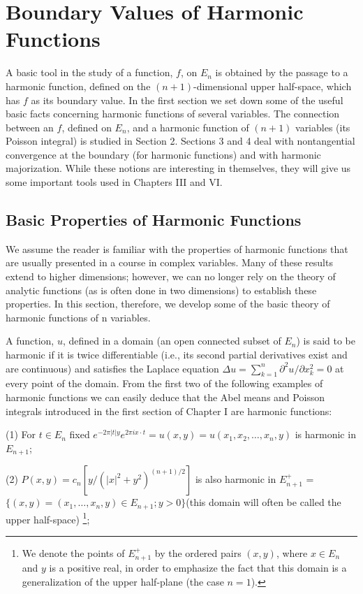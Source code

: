 \chapter{Boundary Values of Harmonic Functions}
\label{ch:c2}

A basic tool in the study of a function, $f$, on $E_n$ is obtained by the passage to a harmonic function, defined on the $(n+1)$-dimensional upper half-space, which has $f$ as its boundary value. In the first section we set down some of the useful basic facts concerning harmonic functions of several variables. The connection between an $f$, defined on $E_n$, and a harmonic function of $(n+1)$ variables (its Poisson integral) is studied in Section 2. Sections 3 and 4 deal with nontangential convergence at the boundary (for harmonic functions) and with harmonic majorization. While these notions are interesting in themselves, they will give us some important tools used in Chapters III and VI.

\section{Basic Properties of Harmonic Functions}

We assume the reader is familiar with the properties of harmonic functions that are usually presented in a course in complex variables. Many of these results extend to higher dimensions; however, we can no longer rely on the theory of analytic functions (as is often done in two dimensions) to establish these properties. In this section, therefore, we develop some of the basic theory of harmonic functions of n variables.

A function, $u$, defined in a domain (an open connected subset of $E_n$) is said to be harmonic if it is twice differentiable (i.e., its second partial derivatives exist and are continuous) and satisfies the Laplace equation $\Delta u = \sum_{k=1}^{n} \partial^2 u / \partial x_k^2 = 0$ at every point of the domain. From the first two of the following examples of harmonic functions we can easily deduce that the Abel means and Poisson integrals introduced in the first section of Chapter I are harmonic functions:

(1) For $t \in E_n$ fixed $e^{-2\pi|t|y} e^{2\pi i x \cdot t} = u(x, y) = u(x_1, x_2, \ldots, x_n, y)$ is harmonic in $E_{n+1}$;

(2) $P(x, y) = c_n[y/(|x|^2 + y^2)^{(n+1)/2}]$ is also harmonic in $E_{n+1}^+$ = $\{(x, y) = (x_1, \ldots, x_n, y) \in E_{n+1}; y > 0\}$(this domain will often be called the upper half-space) \footnote{We denote the points of $E_{n+1}^+$ by the ordered pairs $(x, y)$, where $x \in E_n$ and $y$ is a positive real, in order to emphasize the fact that this domain is a generalization of the upper half-plane (the case $n = 1$).};

